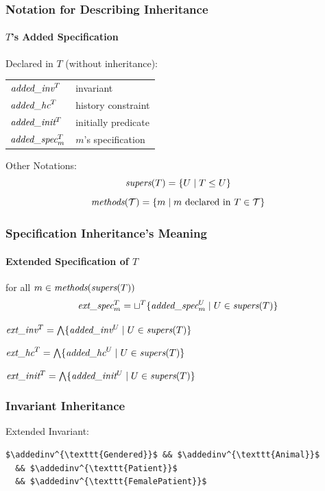 \begin{frame}
\frametitle{Notation for Describing Inheritance}
\framesubtitle{$T$'s Added Specification}

Declared in $T$ (without inheritance):
\begin{center}
\begin{tabular}{ll}
${\textit{added}}\_{\textit{inv}}^T$ & invariant \\
${\textit{added}}\_{\textit{hc}}^T$ & history constraint\\
${\textit{added}}\_{\textit{init}}^T$ & initially predicate \\
${\textit{added}}\_{\textit{spec}}^T_m$ & $m$'s specification \\
\end{tabular}
\end{center}

Other Notations:
\begin{displaymath}
\textit{supers}(T) = \{U \mid T \leq U\}
\end{displaymath}
\begin{displaymath}
\textit{methods}({\cal T}) = \{m \mid m \mbox{ declared in } T \in {\cal T}\}
\end{displaymath}
\end{frame}

\begin{frame}
\frametitle{Specification Inheritance's Meaning}
\framesubtitle{Extended Specification of $T$}

\begin{description}[Constraint:]
\item[Methods:]
for all $m \in \textit{methods}(\textit{supers}(T))$
\begin{displaymath}
{\textit{ext}}\_{\textit{spec}}^T_m = \sqcup^T \{{\textit{added}}\_{\textit{spec}}^U_m \mid U \in \textit{supers}(T)\}
\end{displaymath}

\item[Invariant:]
${\textit{ext}}\_{\textit{inv}}^T = \bigwedge \{{\textit{added}}\_{\textit{inv}}^U \mid U \in \textit{supers}(T)\}$

\item[Constraint:]
${\textit{ext}}\_{\textit{hc}}^T = \bigwedge \{{\textit{added}}\_{\textit{hc}}^U \mid U \in \textit{supers}(T)\}$

\item[Initially:]
${\textit{ext}}\_{\textit{init}}^T = \bigwedge \{{\textit{added}}\_{\textit{init}}^U \mid U \in \textit{supers}(T)\}$
\end{description}
\end{frame}

\begin{frame}[fragile]
\frametitle{Invariant Inheritance}


Extended Invariant:

\begin{lstlisting}[mathescape=true]
  $\addedinv^{\texttt{Gendered}}$ && $\addedinv^{\texttt{Animal}}$
  && $\addedinv^{\texttt{Patient}}$
  && $\addedinv^{\texttt{FemalePatient}}$
\end{lstlisting}
\end{frame}

